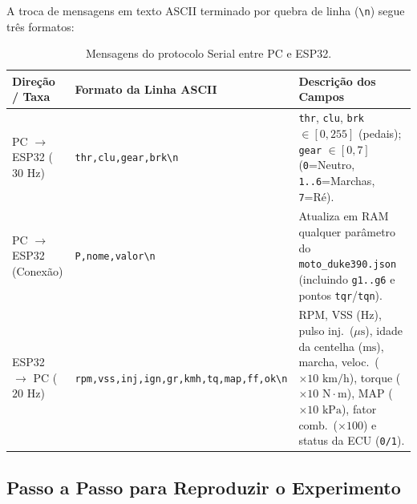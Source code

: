 \documentclass[12pt,a4paper]{article}
\begin{document}
A troca de mensagens em texto ASCII terminado por quebra de linha (\texttt{\textbackslash n}) segue três formatos:

\begin{table}[H]
\centering
\caption{Mensagens do protocolo Serial entre PC e ESP32.}
\footnotesize
\begin{tabularx}{\textwidth}{@{}llX@{}}
\toprule
\textbf{Direção / Taxa} & \textbf{Formato da Linha ASCII} & \textbf{Descrição dos Campos} \\
\midrule
PC $\rightarrow$ ESP32 ($30\text{ Hz}$) & \texttt{thr,clu,gear,brk\textbackslash n} & \texttt{thr}, \texttt{clu}, \texttt{brk} $\in [0,255]$ (pedais); \texttt{gear} $\in [0,7]$ (\texttt{0}=Neutro, \texttt{1..6}=Marchas, \texttt{7}=Ré). \\
PC $\rightarrow$ ESP32 (Conexão) & \texttt{P,nome,valor\textbackslash n} & Atualiza em RAM qualquer parâmetro do \texttt{moto\_duke390.json} (incluindo \texttt{g1..g6} e pontos \texttt{tqr}/\texttt{tqn}). \\
ESP32 $\rightarrow$ PC ($20\text{ Hz}$) & \texttt{rpm,vss,inj,ign,gr,kmh,tq,map,ff,ok\textbackslash n} & RPM, VSS ($\text{Hz}$), pulso inj.\ ($\mu\text{s}$), idade da centelha ($\text{ms}$), marcha, veloc.\ ($\times 10\text{ km/h}$), torque ($\times 10\text{ N}\cdot\text{m}$), MAP ($\times 10\text{ kPa}$), fator comb.\ ($\times 100$) e status da ECU (\texttt{0/1}). \\
\bottomrule
\end{tabularx}
\end{table}

\subsection{Passo a Passo para Reproduzir o Experimento}
\end{document}
